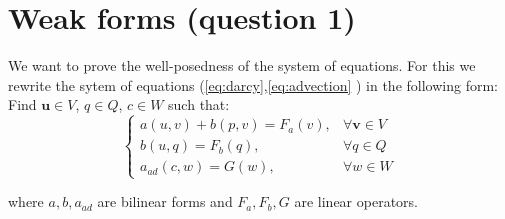 \documentclass[conference]{IEEEtran}
\begin{document}
\section{Weak forms (question 1)}
We want to prove the well-posedness of the system of equations. For this we rewrite the sytem of equations (\ref{eq:darcy},\ref{eq:advection} ) in the following form:\\
Find $\textbf{u} \in V$, $q \in Q$, $c \in W$ such that:  
\begin{equation}
    \begin{cases}
      a(u,v)+b(p,v) = F_a(v) , &\forall \textbf{v} \in V \\
      b(u,q) = F_b(q) ,        &\forall q \in Q \\
      a_{ad}(c,w) = G(w) ,     &\forall w \in W
    \end{cases}
    \label{eq:weak}
\end{equation}

where $a,b,a_{ad}$ are bilinear forms and $F_a, F_b, G$ are linear operators.


\end{document}
